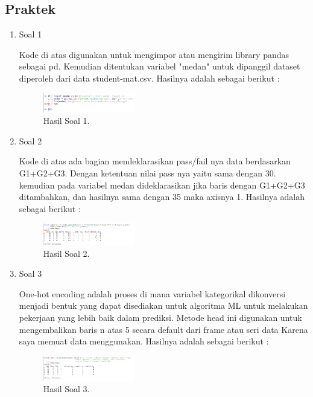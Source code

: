 \subsection{Praktek}
\begin{enumerate}
	\item Soal 1
	\hfill\break
	
	Kode di atas digunakan untuk mengimpor atau mengirim library pandas sebagai pd. Kemudian ditentukan variabel "medan" untuk dipanggil dataset diperoleh dari data student-mat.csv. Hasilnya adalah sebagai berikut :
	\begin{figure}[H]
	\centering
		\includegraphics[width=4cm]{figures/1174021/tugas2/materi/hasil1.PNG}
		\caption{Hasil Soal 1.}
	\end{figure}

	\item Soal 2
	\hfill\break
	
	Kode di atas ada bagian mendeklarasikan pass/fail nya data berdasarkan G1+G2+G3. Dengan ketentuan nilai pass nya yaitu sama dengan 30. kemudian pada variabel medan dideklarasikan jika baris dengan G1+G2+G3 ditambahkan, dan hasilnya sama dengan 35 maka axisnya 1. Hasilnya adalah sebagai berikut :
	\begin{figure}[H]
	\centering
		\includegraphics[width=4cm]{figures/1174021/tugas2/materi/hasil2.PNG}
		\caption{Hasil Soal 2.}
	\end{figure}
	
	\item Soal 3
	\hfill\break
	
	One-hot encoding adalah proses di mana variabel kategorikal dikonversi menjadi bentuk yang dapat disediakan untuk algoritma ML untuk melakukan pekerjaan yang lebih baik dalam prediksi. Metode head ini digunakan untuk mengembalikan baris n atas 5 secara default dari frame atau seri data Karena saya memuat data menggunakan. Hasilnya adalah sebagai berikut :
	\begin{figure}[H]
	\centering
		\includegraphics[width=4cm]{figures/1174021/tugas2/materi/hasil3.PNG}
		\caption{Hasil Soal 3.}
	\end{figure}


\end{enumerate}
